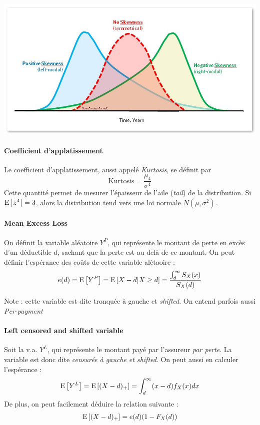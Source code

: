 \documentclass[12pt, french]{report}
\begin{document}
\begin{center}
\includegraphics[scale=0.4]{Figures/skewness_interpretation.jpg}
\end{center}

\paragraph{Coefficient d'applatissement}
Le coefficient d'applatissement, aussi appelé \textit{Kurtosis}, se définit par
\begin{equation}
\text{Kurtosis} = \frac{\mu_4}{\sigma^4}
\end{equation}
Cette quantité permet de mesurer l'épaisseur de l'aile (\textit{tail}) de la distribution. Si $\mathrm{E} \left[ z^4 \right] =3$, alors la distribution tend vers une loi normale $N(\mu, \sigma^2)$.

\paragraph{Mean Excess Loss}
On définit la variable aléatoire $Y^P$, qui représente le montant de perte en excès d'un déductible $d$, sachant que la perte est au delà de ce montant. On peut définir l'espérance des coûts de cette variable alétaoire : 
\begin{equation}
e(d) = \mathrm{E} \left[ Y^P \right] = \mathrm{E} \left[ X-d | X \geq d \right] = \frac{\int_{d}^{\infty} S_X(x)}{S_X(d)}
\end{equation}

Note : cette variable est dite tronquée à gauche et \textit{shifted}. On entend parfois aussi \textit{Per-payment}
	

\paragraph{Left censored and shifted variable}
Soit la v.a. $Y^L$, qui représente le montant payé par l'assureur \textit{par perte}. La variable est donc dite \textit{censurée à gauche et shifted}. On peut aussi en calculer l'espérance : 
\begin{equation}
\mathrm{E} \left[ Y^L \right] = \mathrm{E} \left[ (X-d)_+ \right] = \int_{d}^{\infty} (x-d) f_X(x) dx
\end{equation}
De plus, on peut facilement déduire la relation suivante : 
\begin{align*}
\mathrm{E} \left[ (X-d)_+ \right] = e(d) (1 - F_X(d))
\end{align*}
\end{document}
